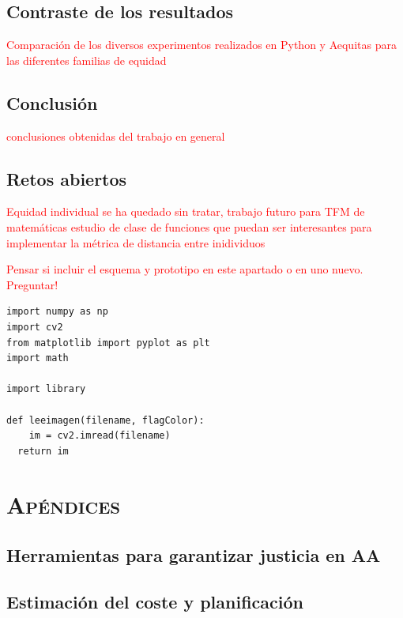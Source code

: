 \documentclass[oneside,openright,titlepage,numbers=noenddot,openany,headinclude,footinclude=true,
cleardoublepage=empty,abstractoff,BCOR=5mm,paper=a4,fontsize=12pt,main=spanish]{scrreprt}
\begin{document}
\chapter{Contraste de los resultados}

\textcolor{red}{Comparación de los diversos experimentos realizados en Python y Aequitas para las diferentes familias de equidad}

\chapter{Conclusión}

\textcolor{red}{conclusiones obtenidas del trabajo en general}

\chapter{Retos abiertos}

\textcolor{red}{Equidad individual se ha quedado sin tratar, trabajo futuro para TFM de matemáticas estudio de clase de funciones que puedan ser interesantes para implementar la métrica de distancia entre inidividuos}

\textcolor{red}{Pensar si incluir el esquema y prototipo en este apartado o en uno nuevo. Preguntar!}

\begin{verbatim}
import numpy as np
import cv2
from matplotlib import pyplot as plt
import math

import library

def leeimagen(filename, flagColor):
    im = cv2.imread(filename)
  return im
\end{verbatim}



\ctparttext{\color{black}\begin{center}
\end{center}}
\part*{\textsc{Apéndices}}

\appendix
\chapter{Herramientas para garantizar justicia en AA}\label{ap:herr_just}


\chapter{Estimación del coste y planificación}\label{ap:coste_plan}

\end{document}
